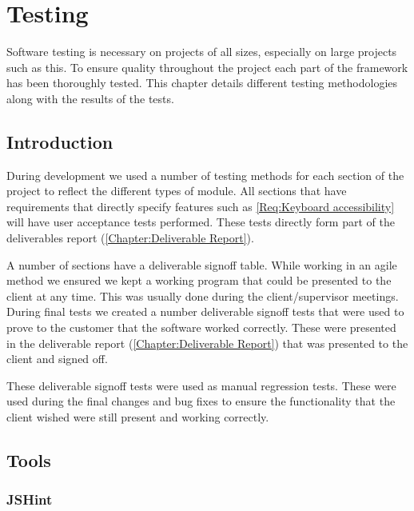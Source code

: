 
\chapter{Testing} \label{Chapter: Testing}

\begin{preamble}
Software testing is necessary on projects of all sizes, especially on large projects such as this. To ensure quality throughout the project each part of the framework has been thoroughly tested. This chapter details different testing methodologies along with the results of the tests.
\end{preamble}

\section{Introduction}

During development we used a number of testing methods for each section of the project to reflect the different types of module. All sections that have requirements that directly specify features such as \cref{Req:Keyboard accessibility} will have user acceptance tests performed. These tests directly form part of the deliverables report (\autoref{Chapter:Deliverable Report}).

A number of sections have a deliverable signoff table. While working in an agile method we ensured we kept a working program that could be presented to the client at any time. This was usually done during the client/supervisor meetings. During final tests we created a number deliverable signoff tests that were used to prove to the customer that the software worked correctly. These were presented in the deliverable report (\autoref{Chapter:Deliverable Report}) that was presented to the client and signed off.

These deliverable signoff tests were used as manual regression tests. These were used during the final changes and bug fixes to ensure the functionality that the client wished were still present and working correctly.

\section{Tools}

\subsection{JSHint}

